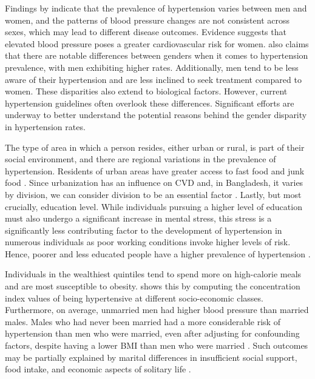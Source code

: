 \documentclass[
  12pt,
  a4paper]{article}
\begin{document}
Findings by \citet{connelly2022sex} indicate that the prevalence of hypertension varies between men and women, and the patterns of blood pressure changes are not consistent across sexes, which may lead to different disease outcomes. Evidence suggests that elevated blood pressure poses a greater cardiovascular risk for women. \citep{song_gender_2020} also claims that there are notable differences between genders when it comes to hypertension prevalence, with men exhibiting higher rates. Additionally, men tend to be less aware of their hypertension and are less inclined to seek treatment compared to women. These disparities also extend to biological factors. However, current hypertension guidelines often overlook these differences. Significant efforts are underway to better understand the potential reasons behind the gender disparity in hypertension rates.

The type of area in which a person resides, either urban or rural, is part of their social environment, and there are regional variations in the prevalence of hypertension. Residents of urban areas have greater access to fast food and junk food \citep{zahangir_malnutrition_2017}. Since urbanization has an influence on CVD and, in Bangladesh, it varies by division, we can consider division to be an essential factor \citep{yusuf2001global}. Lastly, but most crucially, education level. While individuals pursuing a higher level of education must also undergo a significant increase in mental stress, this stress is a significantly less contributing factor to the development of hypertension in numerous individuals as poor working conditions invoke higher levels of risk. Hence, poorer and less educated people have a higher prevalence of hypertension \citep{leng2015socioeconomic}.

Individuals in the wealthiest quintiles tend to spend more on high-calorie meals and are most susceptible to obesity. \citet{biswas_socio-economic_2016} shows this by computing the concentration index values of being hypertensive at different socio-economic classes. Furthermore, on average, unmarried men had higher blood pressure than married males. Males who had never been married had a more considerable risk of hypertension than men who were married, even after adjusting for confounding factors, despite having a lower BMI than men who were married \citep{ramezankhani2019associations}. Such outcomes may be partially explained by marital differences in insufficient social support, food intake, and economic aspects of solitary life \citep{lipowicz_marital_2005}.
\end{document}
